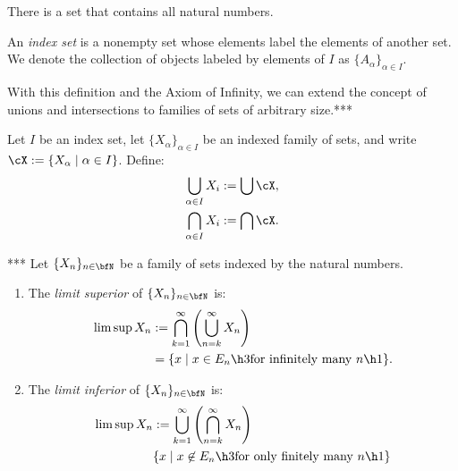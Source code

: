     \begin{axiom}
        There is a set that contains all natural numbers.
    \end{axiom}

    \begin{definition}
        An \textit{index set} is a nonempty set whose elements label the elements of another set. We denote the collection of objects labeled by elements of $I$ as $\{A_\alpha\}_{\alpha \in I}$.
    \end{definition}

    With this definition and the Axiom of Infinity, we can extend the concept of unions and intersections to families of sets of arbitrary size.***

    \begin{definition}
        Let $I$ be an index set, let $\{X_\alpha\}_{\alpha \in I}$ be an indexed family of sets, and write $\cX := \{X_\alpha \mid \alpha \in I\}$. Define:
            \begin{equation*}
            \begin{split}
                \bigcup_{\alpha \in I}X_i &:= \bigcup \cX, \\
                \bigcap_{\alpha \in I}X_i &:= \bigcap \cX.
            \end{split}
            \end{equation*}
    \end{definition}

    \begin{definition}***
        Let $\{X_n\}_{n \in \bfN}$ be a family of sets indexed by the natural numbers.
        \begin{enumerate}[label = (\arabic*),itemsep=1pt,topsep=3pt]
            \item The \textit{limit superior} of $\{X_n\}_{n \in \bfN}$ is:
                \begin{equation*}
                \begin{split}
                    \limsup X_n 
                    & := \bigcap_{k = 1}^\infty \left( \bigcup_{n = k}^\infty X_n\right) \\
                    & = \{x \mid x \in E_n \h3\text{for infinitely many $n$}\h1\}. 
                \end{split}
                \end{equation*}
            \item The \textit{limit inferior} of $\{X_n\}_{n \in \bfN}$ is:
                \begin{equation*}
                \begin{split}
                    \limsup X_n 
                    & := \bigcup_{k = 1}^\infty \left( \bigcap_{n = k}^\infty X_n\right) \\
                    & \{x \mid x \not\in E_n \h3\text{for only finitely many $n$}\h1\}
                \end{split}
                \end{equation*}
        \end{enumerate}
    \end{definition}

